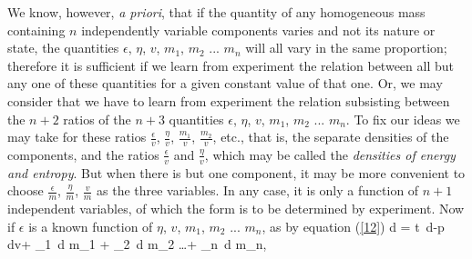 \documentclass[12pt]{article}
\begin{document}
We know, however, \textit{a priori}, that if the quantity of any homogeneous mass containing $n$ independently variable components varies and not its nature or state, the quantities $\epsilon$, $\eta$, $v$, $m_1$, $m_2$ ... $m_n$ will all vary in the same proportion; therefore it is sufficient if we learn from experiment the relation between all but any one of these quantities for a given constant value of that one.  Or, we may consider that we have to learn from experiment the relation subsisting between the $n +2$ ratios of the $n+3$ quantities $\epsilon$, $\eta$, $v$, $m_1$, $m_2$ ... $m_n$.
To fix our ideas we may take for these ratios $\frac{\epsilon}{v}$, $\frac{\eta}{v}$, $\frac{m_1}{v}$, $\frac{m_2}{v}$, etc., that is, the separate densities of the components, and the ratios $\frac{\epsilon}{v}$ and $\frac{\eta}{v}$, which may be called the \textit{densities of energy and entropy}. But when there is but one component, it may be more convenient to choose $\frac{\epsilon}{m}$, $\frac{\eta}{m}$, $\frac{v}{m}$ as the three variables. In any case, it is only a function of $n+ 1$ independent variables, of which the form is to be determined by experiment.
Now if $\epsilon$ is a known function of $\eta$, $v$, $m_1$, $m_2$ ... $m_n$, as by equation (\ref{12})
\eqs d \epsilon = t \,d\eta-p \,dv+ \mu_1 \,d m_1 + \mu_2 \,d m_2 \dots + \mu_n \,d m_n,    \label{86}\eqe
\end{document}
